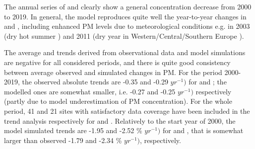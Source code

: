 The annual series of \PM[10] and \PM[2.5] clearly show a general concentration decrease from 2000 to 2019. In general, the model reproduces quite well the year-to-year changes in \PM[10] and \PM[2.5], including enhanced PM levels due to meteorological conditions e.g. in 2003 (dry hot summer \citep{EMEP:PM2005}) and 2011 (dry year in Western/Central/Southern Europe \citep{EMEP:PM2013}).

The average \PM[10] and \PM[2.5] trends derived from observational data and model simulations are negative for all considered periods, and there is quite good consistency between average observed and simulated changes in PM. %
For the period 2000-2019, the observed absolute trends are -0.35 and -0.29 \ug $yr^{-1})$ for \PM[10] and \PM[2.5]; the modelled ones are somewhat smaller, i.e. -0.27 and -0.25 \ug $yr^{-1})$ respectively (partly due to model underestimation of PM concentration). For the whole period, 41 and 21 sites with satisfactory data coverage have been included in the trend analysis respectively for \PM[10] and \PM[2.5]. Relatively to the start year of 2000, the model simulated trends are -1.95 and -2.52 \% $yr^{-1})$ for \PM[10] and \PM[2.5], that is somewhat larger than observed -1.79 and -2.34 \% $yr^{-1})$, respectively. 



\clearpage
\renewcommand\bibname{References}      %

